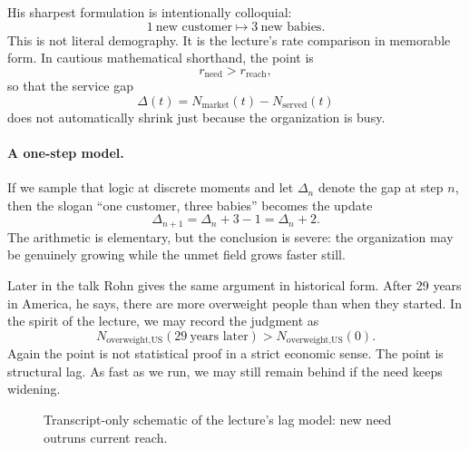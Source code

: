 His sharpest formulation is intentionally colloquial:
\begin{equation}
1\ \text{new customer} \mapsto 3\ \text{new babies}.
\end{equation}
This is not literal demography. It is the lecture's rate comparison in memorable form. In cautious mathematical shorthand, the point is
\begin{equation}
r_{\text{need}} > r_{\text{reach}},
\end{equation}
so that the service gap
\begin{equation}
\Delta(t)=N_{\text{market}}(t)-N_{\text{served}}(t)
\end{equation}
does not automatically shrink just because the organization is busy.

\paragraph{A one-step model.}
If we sample that logic at discrete moments and let \(\Delta_n\) denote the gap at step \(n\), then the slogan ``one customer, three babies'' becomes the update
\begin{equation}
\Delta_{n+1}=\Delta_n+3-1=\Delta_n+2.
\end{equation}
The arithmetic is elementary, but the conclusion is severe: the organization may be genuinely growing while the unmet field grows faster still.

Later in the talk Rohn gives the same argument in historical form. After 29 years in America, he says, there are more overweight people than when they started. In the spirit of the lecture, we may record the judgment as
\begin{equation}
N_{\text{overweight,US}}(29\ \text{years later}) > N_{\text{overweight,US}}(0).
\end{equation}
Again the point is not statistical proof in a strict economic sense. The point is structural lag. As fast as we run, we may still remain behind if the need keeps widening.

\begin{figure}[h]
\centering
{}
\caption{Transcript-only schematic of the lecture's lag model: new need outruns current reach.}
\end{figure}

